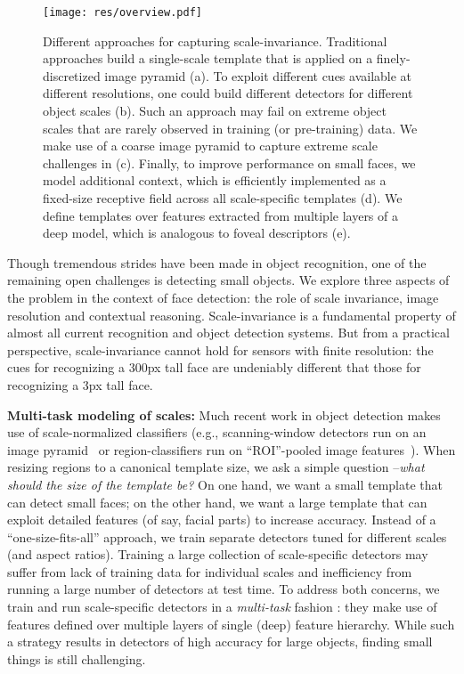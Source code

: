 \documentclass[10pt,twocolumn,letterpaper]{article}
\begin{document}
\begin{figure*}[t!]
  \centering
  \texttt{[image: res/overview.pdf]}
  \caption{Different approaches for capturing scale-invariance. Traditional approaches build a single-scale template that is applied on a finely-discretized image pyramid (a). To exploit different cues available at different resolutions, one could build different detectors for different object scales (b). Such an approach may fail on extreme object scales that are rarely observed in training (or pre-training) data. We make use of a coarse image pyramid to capture extreme scale challenges in (c). Finally, to improve performance on small faces, we model additional context, which is efficiently implemented as a fixed-size receptive field across all scale-specific templates (d). We define templates over features extracted from multiple layers of a deep model, which is analogous to foveal descriptors (e). }
\label{fig:overview}
\end{figure*}


Though tremendous strides have been made in object recognition, one of the remaining open challenges is detecting small objects. We explore three aspects of the problem in the context of face detection: the role of scale invariance, image resolution and contextual reasoning. Scale-invariance is a fundamental property of almost all current recognition and object detection systems. But from a practical perspective, scale-invariance cannot hold for sensors with finite resolution: the cues for recognizing a 300px tall face are undeniably different that those for recognizing a 3px tall face. 


{\bf Multi-task modeling of scales:} Much recent work in object detection makes use of scale-normalized classifiers (e.g., scanning-window detectors run on an image pyramid~\cite{felzenszwalb2010object} or region-classifiers run on ``ROI''-pooled image features~\cite{girshick2014rich,ren2015faster}). When resizing regions to a canonical template size, we ask a simple question --{\it what should the
  size of the template be?} On one hand, we want a small template that
can detect small faces; on the other hand, we want a large template
that can exploit detailed features (of say, facial parts) to increase
accuracy. Instead of a ``one-size-fits-all'' approach, we train separate detectors tuned for different scales (and aspect ratios). Training a large collection of scale-specific detectors may suffer from lack of training data for individual scales and inefficiency from running a large number of detectors at test time. To address both concerns, we train and run scale-specific detectors in a {\em multi-task} fashion : they make use of features defined over multiple layers of single (deep) feature hierarchy. While such a strategy results in detectors of high accuracy for large objects, finding small things is still challenging.
\end{document}
